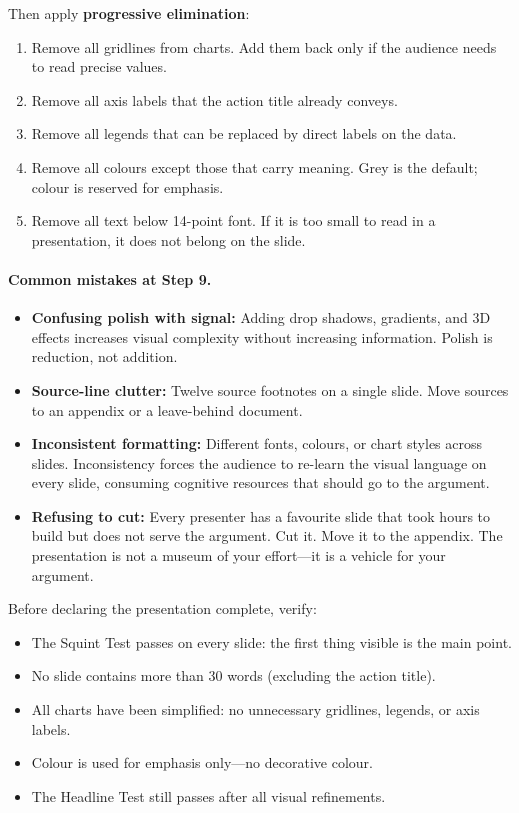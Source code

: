 Then apply \textbf{progressive elimination}:
\begin{enumerate}
  \item Remove all gridlines from charts. Add them back only if the audience needs to read precise values.
  \item Remove all axis labels that the action title already conveys.
  \item Remove all legends that can be replaced by direct labels on the data.
  \item Remove all colours except those that carry meaning. Grey is the default; colour is reserved for emphasis.
  \item Remove all text below 14-point font. If it is too small to read in a presentation, it does not belong on the slide.
\end{enumerate}

\paragraph{Common mistakes at Step 9.}
\begin{itemize}
  \item \textbf{Confusing polish with signal:} Adding drop shadows, gradients, and 3D effects increases visual complexity without increasing information. Polish is reduction, not addition.
  \item \textbf{Source-line clutter:} Twelve source footnotes on a single slide. Move sources to an appendix or a leave-behind document.
  \item \textbf{Inconsistent formatting:} Different fonts, colours, or chart styles across slides. Inconsistency forces the audience to re-learn the visual language on every slide, consuming cognitive resources that should go to the argument.
  \item \textbf{Refusing to cut:} Every presenter has a favourite slide that took hours to build but does not serve the argument. Cut it. Move it to the appendix. The presentation is not a museum of your effort---it is a vehicle for your argument.
\end{itemize}

\begin{keybox}
Before declaring the presentation complete, verify:
\begin{itemize}[leftmargin=1.2em]
  \item The Squint Test passes on every slide: the first thing visible is the main point.
  \item No slide contains more than 30 words (excluding the action title).
  \item All charts have been simplified: no unnecessary gridlines, legends, or axis labels.
  \item Colour is used for emphasis only---no decorative colour.
  \item The Headline Test still passes after all visual refinements.
\end{itemize}
\end{keybox}

